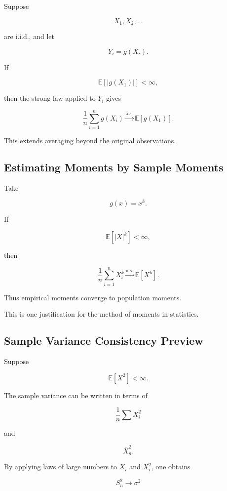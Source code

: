 Suppose

\[
X_1,X_2,\ldots
\]

are i.i.d., and let

\[
Y_i=g(X_i).
\]

If

\[
\mathbb{E}[|g(X_1)|]<\infty,
\]

then the strong law applied to \(Y_i\) gives

\[
\boxed{
\frac1n
\sum_{i=1}^{n}
g(X_i)
\xrightarrow{\text{a.s.}}
\mathbb{E}[g(X_1)].
}
\]

This extends averaging beyond the original observations.

\subsection{Estimating Moments by Sample Moments}
\label{subsec:estimating-moments-lln}

Take

\[
g(x)=x^k.
\]

If

\[
\mathbb{E}[|X|^k]<\infty,
\]

then

\[
\boxed{
\frac1n
\sum_{i=1}^{n}
X_i^k
\xrightarrow{\text{a.s.}}
\mathbb{E}[X^k].
}
\]

Thus empirical moments converge to population moments.

This is one justification for the method of moments in statistics.

\subsection{Sample Variance Consistency Preview}
\label{subsec:sample-variance-consistency}

Suppose

\[
\mathbb{E}[X^2]<\infty.
\]

The sample variance can be written in terms of

\[
\frac1n
\sum X_i^2
\]

and

\[
\overline{X}_n^2.
\]

By applying laws of large numbers to \(X_i\) and \(X_i^2\), one obtains

\[
\boxed{
S_n^2
\to
\sigma^2
}
\]

